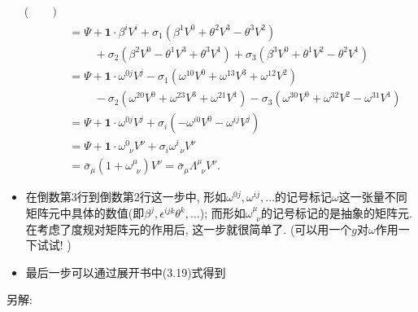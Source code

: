 \begin{equation}
\begin{aligned}
\begin{pmatrix}
\begin{matrix}
      \end{matrix}
                    \end{pmatrix}                                                                                                        \\
         & = \Psi + \mathbf{1} \cdot \beta^i V^i + \sigma_1 (\beta^1 V^0 + \theta^2 V^3 - \theta^3 V^2)                                              \\
         & \qquad\ + \sigma_2 (\beta^2 V^0 -\theta^1 V^3 + \theta^3 V^1) + \sigma_3 (\beta^3 V^0 + \theta^1 V^2 - \theta^2 V^1)                      \\
         & = \Psi + \mathbf{1} \cdot \omega^{0j} V^j - \sigma_1 (\omega^{10}V^0 + \omega^{13}V^3 + \omega^{12}V^2)                                   \\
         & \qquad\ - \sigma_2 (\omega^{20} V^0 + \omega^{23} V^3 + \omega^{21} V^1) - \sigma_3 (\omega^{30} V^0 + \omega^{32} V^2 - \omega^{31} V^1) \\
         & = \Psi + \mathbf{1} \cdot \omega^{0j} V^j + \sigma_i (-\omega^{i0}V^0 - \omega^{ij}V^j)                                                   \\
         & = \Psi + \mathbf{1} \cdot \omega^{0}_{\phantom{0}\nu} V^{\nu} + \sigma_i \omega^{i}_{\phantom{0}\nu}V^{\nu}                               \\
         & = \bar{\sigma}_{\mu} (1 + \omega^{\mu}_{\phantom{0}\nu}) V^{\nu} = \bar{\sigma}_{\mu} \Lambda^{\mu}_{\phantom{0}\nu} V^{\nu}.
  \end{aligned}
\end{equation}
\begin{itemize}
  \item 在倒数第3行到倒数第2行这一步中, 形如$\omega^{0j}, \omega^{ij},\dots$的记号标记$\omega$这一张量不同矩阵元中具体的数值(即$\beta^j, \epsilon^{ijk}\theta^k,\dots$); 而形如$\omega^{\mu}_{\phantom{0}\nu}$的记号标记的是抽象的矩阵元.
        在考虑了度规对矩阵元的作用后, 这一步就很简单了. (可以用一个$g$对$\omega$作用一下试试! )
  \item 最后一步可以通过展开书中(3.19)式得到
\end{itemize}
另解:
